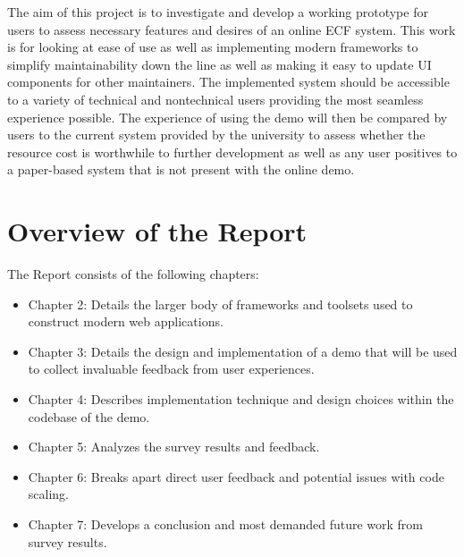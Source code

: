 The aim of this project is to investigate and develop a working prototype for users to assess necessary features and desires of an online ECF system. This work is for looking at ease of use as well as implementing modern frameworks to simplify maintainability down the line as well as making it easy to update UI components for other maintainers. The implemented system should be accessible to a variety of technical and nontechnical users providing the most seamless experience possible. The experience of using the demo will then be compared by users to the current system provided by the university to assess whether the resource cost is worthwhile to further development as well as any user positives to a paper-based system that is not present with the online demo. 

\section{Overview of the Report}

The Report consists of the following chapters:
\begin{itemize}
  \item Chapter 2: Details the larger body of frameworks and toolsets used to construct modern web applications.
  \item Chapter 3: Details the design and implementation of a demo that will be used to collect invaluable feedback from user experiences.
  \item Chapter 4: Describes implementation technique and design choices within the codebase of the demo.
  \item Chapter 5: Analyzes the survey results and feedback.
  \item Chapter 6: Breaks apart direct user feedback and potential issues with code scaling.
  \item Chapter 7: Develops a conclusion and most demanded future work from survey results.
\end{itemize}
